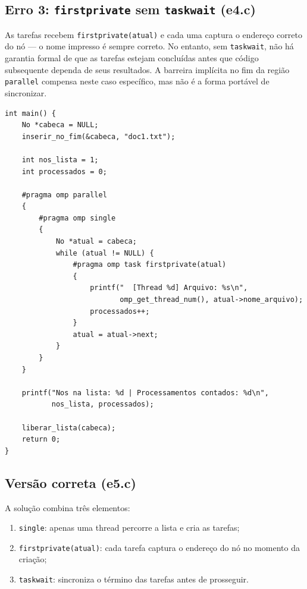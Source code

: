 \documentclass[11pt,letterpaper]{article}
\begin{document}
\subsection{Erro 3: \texttt{firstprivate} sem \texttt{taskwait} (e4.c)}
As tarefas recebem \texttt{firstprivate(atual)} e cada uma captura o endereço correto do nó — o nome impresso é sempre correto. No entanto, sem \texttt{taskwait}, não há garantia formal de que as tarefas estejam concluídas antes que código subsequente dependa de seus resultados. A barreira implícita no fim da região \texttt{parallel} compensa neste caso específico, mas não é a forma portável de sincronizar.

\begin{lstlisting}[caption={main() de e4.c, firstprivate sem taskwait}]
int main() {
    No *cabeca = NULL;
    inserir_no_fim(&cabeca, "doc1.txt");

    int nos_lista = 1;
    int processados = 0;

    #pragma omp parallel
    {
        #pragma omp single
        {
            No *atual = cabeca;
            while (atual != NULL) {
                #pragma omp task firstprivate(atual)
                {
                    printf("  [Thread %d] Arquivo: %s\n",
                           omp_get_thread_num(), atual->nome_arquivo);
                    processados++;
                }
                atual = atual->next;
            }
        }
    }

    printf("Nos na lista: %d | Processamentos contados: %d\n",
           nos_lista, processados);

    liberar_lista(cabeca);
    return 0;
}
\end{lstlisting}

\subsection{Versão correta (e5.c)}
A solução combina três elementos:
\begin{enumerate}
    \item \texttt{single}: apenas uma thread percorre a lista e cria as tarefas;
    \item \texttt{firstprivate(atual)}: cada tarefa captura o endereço do nó no momento da criação;
    \item \texttt{taskwait}: sincroniza o término das tarefas antes de prosseguir.
\end{enumerate}
\end{document}
